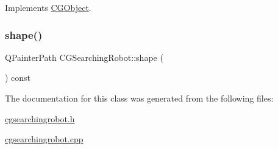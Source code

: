 Implements \mbox{\hyperlink{class_c_g_object_a9622c313eb09ca5fc0e34f5d2aaac910}{C\+G\+Object}}.

\mbox{\label{class_c_g_searching_robot_acd63b054e31c88aaf2070a829e1f897a}} 
\subsubsection{\texorpdfstring{shape()}{shape()}}
{\footnotesize\ttfamily Q\+Painter\+Path C\+G\+Searching\+Robot\+::shape (\begin{DoxyParamCaption}{ }\end{DoxyParamCaption}) const\hspace{0.3cm}{\ttfamily [override]}}



The documentation for this class was generated from the following files\+:\begin{DoxyCompactItemize}
\item 
\mbox{\hyperlink{cgsearchingrobot_8h}{cgsearchingrobot.\+h}}\item 
\mbox{\hyperlink{cgsearchingrobot_8cpp}{cgsearchingrobot.\+cpp}}\end{DoxyCompactItemize}
